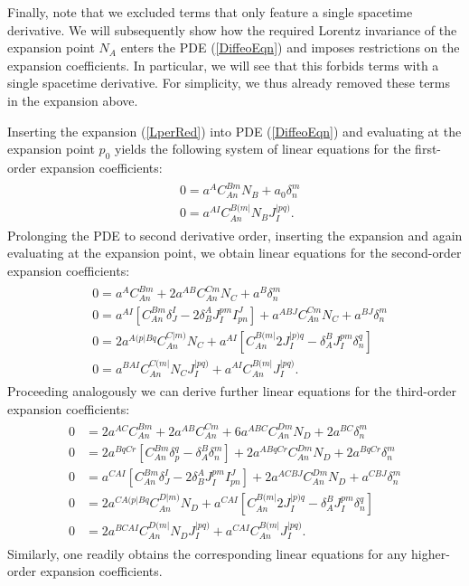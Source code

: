\documentclass[%
preprint,
titlepage,
nofootinbib,
amsmath,amssymb,
showkeys,
aps,
prd,
floatfix,
]{revtex4-2}
\begin{document}
Finally, note that we excluded terms that only feature a single spacetime derivative. We will subsequently show how the required Lorentz invariance of the expansion point $N_A$ enters the PDE (\ref{DiffeoEqn}) and imposes restrictions on the expansion coefficients. In particular, we will see that this forbids terms with a single spacetime derivative. For simplicity, we thus already removed these terms in the expansion above.

Inserting the expansion (\ref{LperRed}) into PDE (\ref{DiffeoEqn}) and evaluating at the expansion point $p_0$ yields the following system of linear equations for the first-order expansion coefficients:
\begin{align}\label{order1}
    \begin{aligned}
    &0 = a^A C_{An}^{Bm}N_B + a_0 \delta^m_n\\
    &0 = a^{AI}C_{An}^{B(m\vert }N_B J^{\vert pq)}_I.
    \end{aligned}
\end{align}
Prolonging the PDE to second derivative order, inserting the expansion and again evaluating at the expansion point, we obtain linear equations for the second-order expansion coefficients: 
\begin{align}\label{order2}
    \begin{aligned}
    &0 = a^A C_{An}^{Bm} + 2 a^{AB}C_{An}^{Cm}N_C + a^B\delta^m_n\\
    &0 = a^{AI}\left [C_{An}^{Bm}\delta^I _J- 2 \delta^A_B J_I^{pm}I^J_{pn} \right ] + a^{ABJ}C_{An}^{Cm}N_C + a^{BJ} \delta^m_n \\
    &0 = 2a^{A(p\vert Bq}C_{An}^{C\vert m)}N_C + a^{AI} \left [C_{An}^{B(m\vert} 2 J_{I}^{\vert p)q} - \delta_A^BJ_I^{pm}\delta^q_n \right ]\\
    &0 = a^{BAI}C_{An}^{C(m\vert}N_CJ_I^{\vert pq)} + a^{AI}C_{An}^{B(m \vert} J_I^{\vert pq)}.
    \end{aligned}
\end{align}
Proceeding analogously we can derive further linear equations for the third-order expansion coefficients:
\begin{align}\label{order3}
\begin{aligned}
0 &= 2 a^{AC}C_{An}^{Bm} + 2a^{AB}C_{An}^{Cm} + 6 a^{ABC}C_{An}^{Dm} N_D + 2a^{BC} \delta^m_n\\
0 &= 2 a^{BqCr} \left [ C_{An}^{Bm} \delta ^q_p - \delta^B_A \delta^m_n \right ] +2 a^{A Bq Cr} C_{An}^{Dm} N_D + 2 a^{BqCr} \delta^m_n\\
0 &= a^{CAI} \left [C_{An}^{Bm}\delta^I _J- 2 \delta^A_B J_I^{pm}I^J_{pn} \right ] + 2 a^{ACBJ} C_{An}^{Dm} N_D + a^{CBJ} \delta ^m _n \\
0 &= 2 a^{C A(p \vert B q} C_{An}^{D \vert m )} N_D + a^{CAI} \left [C_{An}^{B(m\vert} 2 J_{I}^{\vert p)q} - \delta_A^BJ_I^{pm}\delta^q_n \right ]\\
0 &= 2 a^{BCAI}C_{An}^{D(m\vert}N_DJ_I^{\vert pq)} + a^{CAI}C_{An}^{B(m \vert} J_I^{\vert pq)}.
\end{aligned}
\end{align}
Similarly, one readily obtains the corresponding linear equations for any higher-order expansion coefficients. 
\end{document}
